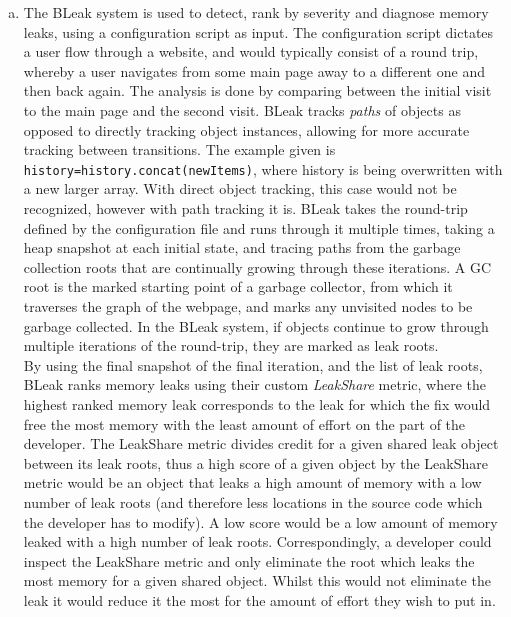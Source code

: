 \documentclass[12pt]{article}
\begin{document}
\begin{enumerate}[(a)]
    \item The BLeak system is used to detect, rank by severity and diagnose memory leaks, using a configuration script as input. The configuration script dictates a user flow through a website, and would typically consist of a round trip, whereby a user navigates from some main page away to a different one and then back again. The analysis is done by comparing between the initial visit to the main page and the second visit. BLeak tracks \textit{paths} of objects as opposed to directly tracking object instances, allowing for more accurate tracking between transitions. The example given is \lstinline!history=history.concat(newItems)!, where history is being overwritten with a new larger array. With direct object tracking, this case would not be recognized, however with path tracking it is. BLeak takes the round-trip defined by the configuration file and runs through it multiple times, taking a heap snapshot at each initial state, and tracing paths from the garbage collection roots that are continually growing through these iterations. A GC root is the marked starting point of a garbage collector, from which it traverses the graph of the webpage, and marks any unvisited nodes to be garbage collected. In the BLeak system, if objects continue to grow through multiple iterations of the round-trip, they are marked as leak roots. \\\newline
    By using the final snapshot of the final iteration, and the list of leak roots, BLeak ranks memory leaks using their custom \textit{LeakShare} metric, where the highest ranked memory leak corresponds to the leak for which the fix would free the most memory with the least amount of effort on the part of the developer. The LeakShare metric divides credit for a given shared leak object between its leak roots, thus a high score of a given object by the LeakShare metric would be an object that leaks a high amount of memory with a low number of leak roots (and therefore less locations in the source code which the developer has to modify). A low score would be a low amount of memory leaked with a high number of leak roots. Correspondingly, a developer could inspect the LeakShare metric and only eliminate the root which leaks the most memory for a given shared object. Whilst this would not eliminate the leak it would reduce it the most for the amount of effort they wish to put in. 

\end{enumerate}
\end{document}
